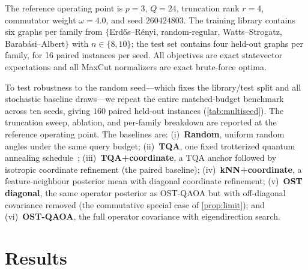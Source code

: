 \documentclass[aps,prresearch,reprint,amsmath,amssymb,floatfix,nofootinbib,superscriptaddress,longbibliography]{revtex4-2}
\theoremstyle{remark}
\newcommand{\OSTQAOA}{\textnormal{\textsc{OST-QAOA}}}
\newcommand{\TQA}{\textnormal{\textsc{TQA}}}
\begin{document}
The reference operating point is \(p=3\), \(Q=24\), truncation rank \(r=4\),
commutator weight \(\omega=4.0\), and seed \(260424803\).  The training library
contains six graphs per family from
\(\{\)Erd\H{o}s--R\'enyi, random-regular, Watts--Strogatz,
Barab\'asi--Albert\(\}\) with \(n\in\{8,10\}\); the test set contains four
held-out graphs per family, for 16 paired instances per seed.  All objectives are
exact statevector expectations and all MaxCut normalizers are exact brute-force
optima.

To test robustness to the random seed---which fixes the library/test split and
all stochastic baseline draws---we repeat the entire matched-budget benchmark
across ten seeds, giving \(160\) paired held-out instances
(\cref{tab:multiseed}).  The truncation sweep, ablation, and per-family
breakdown are reported at the reference operating point.  The baselines are:
(i)~\textbf{Random}, uniform random angles under the same query budget;
(ii)~\textbf{\TQA{}}, one fixed trotterized quantum annealing
schedule~\cite{sack2021};
(iii)~\textbf{\TQA{}+coordinate}, a \TQA{} anchor followed by isotropic
coordinate refinement (the paired baseline);
(iv)~\textbf{kNN+coordinate}, a feature-neighbour posterior mean with diagonal
coordinate refinement;
(v)~\textbf{OST diagonal}, the same operator posterior as \OSTQAOA{} but with
off-diagonal covariance removed (the commutative special case of
\cref{prop:limit}); and
(vi)~\textbf{\OSTQAOA{}}, the full operator covariance with eigendirection search.

\section{Results}

\begin{table}[t]
\centering
\caption{\textbf{Matched-budget benchmark at the reference operating point}
(\(p=3\), \(Q=24\), rank \(4\), seed \(260424803\)).  The table is generated by
\texttt{uqqaoa-reproduce}; values are mean approximation ratio with 95\%
confidence intervals across 16 held-out graphs.  \(\Delta\) is the paired
difference against \TQA{}+coordinate with a bootstrap 95\% interval; \(\bar
Q_{0.98}\) is the mean number of objective queries to reach \(98\%\) of the best
observed ratio (\cref{rem:query}).}
\label{tab:headline}

\end{table}
\end{document}
